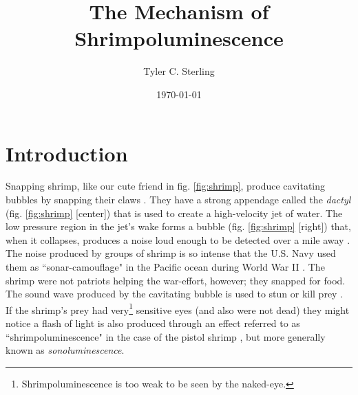 \documentclass[11pt,prb,aps,nofootinbib,superscriptaddress,floatfix]{revtex4-2}
\begin{document}
\title{The Mechanism of Shrimpoluminescence}

\author{Tyler C. Sterling}

\date{\today}

\begin{abstract}
\end{abstract}

\maketitle

\section{Introduction}
Snapping shrimp, like our cute friend in fig. \ref{fig:shrimp}, produce cavitating bubbles by snapping their claws \cite{versluis2000snapping,lohse2001snapping,tang2019bioinspired}. They have a strong appendage called the \emph{dactyl} (fig. \ref{fig:shrimp} [center]) that is used to create a high-velocity jet of water. The low pressure region in the jet's wake forms a bubble (fig. \ref{fig:shrimp} [right]) that, when it collapses, produces a noise loud enough to be detected over a mile away \cite{everest1948acoustical}. The noise produced by groups of shrimp is so intense that the U.S. Navy used them as ``sonar-camouflage" in the Pacific ocean during World War II \cite{versluis2000snapping}. The shrimp were not patriots helping the war-effort, however; they snapped for food. The sound wave produced by the cavitating bubble is used to stun or kill prey \cite{versluis2000snapping}. If the shrimp's prey had very\footnote{Shrimpoluminescence is too weak to be seen by the naked-eye.} sensitive eyes (and also were not dead) they might notice a flash of light is also produced through an effect referred to as ``shrimpoluminescence" in the case of the pistol shrimp \cite{lohse2001snapping}, but more generally known as \emph{sonoluminescence}.
\end{document}

